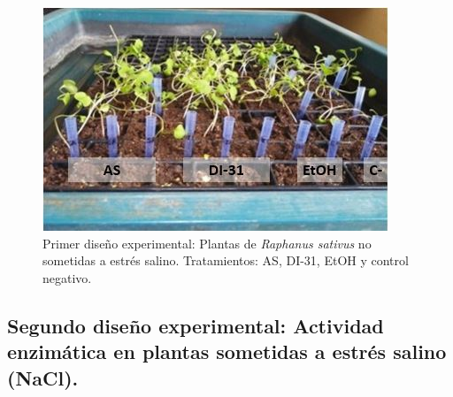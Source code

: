 %


\begin{figure}[hbtp]
	\centering
	\includegraphics[scale=0.70]{Imagenes/plantas}
	\caption{Primer dise\~no experimental: Plantas de \textit{Raphanus sativus} no sometidas a estr\'es salino. Tratamientos: AS, DI-31, EtOH y control negativo.}
	\label{plantas}
\end{figure}

\subsection{Segundo dise\~no experimental: Actividad enzim\'atica en plantas sometidas a estr\'es salino (NaCl).} \label{d2{}}

